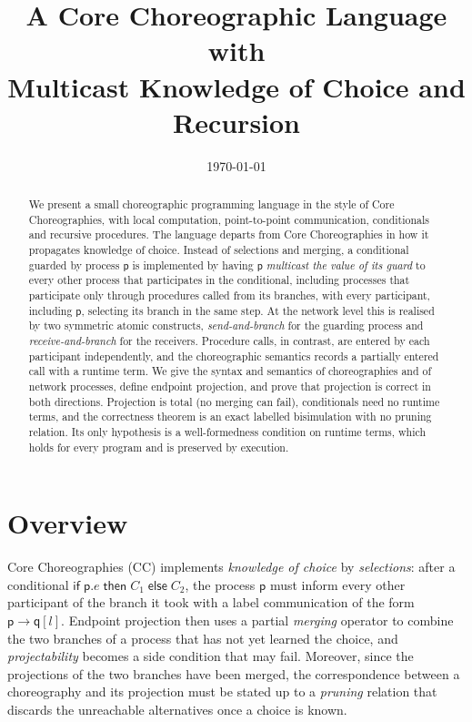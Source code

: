 \documentclass[11pt]{article}
\title{A Core Choreographic Language with\\Multicast Knowledge of Choice and Recursion}
\author{}
\date{\today}
\theoremstyle{plain}
\theoremstyle{definition}
\theoremstyle{remark}
\newcommand{\kw}[1]{\mathsf{#1}}
\newcommand{\kif}{\kw{if}\;}
\newcommand{\kthen}{\;\kw{then}\;}
\newcommand{\kelse}{\;\kw{else}\;}
\newcommand{\pp}{\mathsf{p}}
\newcommand{\qq}{\mathsf{q}}
\newcommand{\ifcond}[3]{\kif #1 \kthen #2 \kelse #3}
\begin{document}
\maketitle

\begin{abstract}
  We present a small choreographic programming language in the style of Core
  Choreographies, with local computation, point-to-point communication,
  conditionals and recursive procedures.  The language departs from Core
  Choreographies in how it propagates knowledge of choice.  Instead of
  selections and merging, a conditional guarded by process $\pp$ is
  implemented by having $\pp$ \emph{multicast the value of its guard} to every
  other process that participates in the conditional, including processes
  that participate only through procedures called from its branches, with
  every participant, including $\pp$, selecting its branch in the same step.
  At the network level this is realised by two symmetric atomic constructs,
  \emph{send-and-branch} for the guarding process and
  \emph{receive-and-branch} for the receivers.  Procedure calls, in contrast,
  are entered by each participant independently, and the choreographic
  semantics records a partially entered call with a runtime term.  We give the
  syntax and semantics of choreographies and of network processes, define
  endpoint projection, and prove that projection is correct in both
  directions.  Projection is total (no merging can fail), conditionals need no
  runtime terms, and the correctness theorem is an exact labelled
  bisimulation with no pruning relation.  Its only hypothesis is a
  well-formedness condition on runtime terms, which holds for every program and
  is preserved by execution.
\end{abstract}

\section*{Overview}

Core Choreographies (CC) implements \emph{knowledge of choice} by
\emph{selections}: after a conditional $\ifcond{\pp.e}{C_1}{C_2}$, the process
$\pp$ must inform every other participant of the branch it took with a label
communication of the form $\pp \to \qq[l]$.  Endpoint projection then uses a
partial \emph{merging} operator to combine the two branches of a process that
has not yet learned the choice, and \emph{projectability} becomes a side
condition that may fail.  Moreover, since the projections of the two branches
have been merged, the correspondence between a choreography and its projection
must be stated up to a \emph{pruning} relation that discards the unreachable
alternatives once a choice is known.
\end{document}
